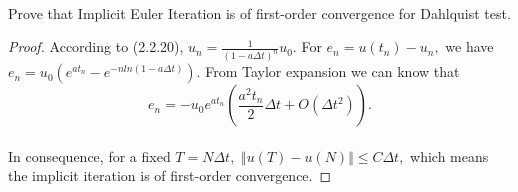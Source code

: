 \documentclass{article}
\newenvironment{problem}[2][Problem]{\begin{trivlist}
\item[\hskip \labelsep {\bfseries #1}\hskip \labelsep {\bfseries #2.}]}{\end{trivlist}}
\begin{document}
\begin{problem}{2}
\text{ }\\
Prove that Implicit Euler Iteration is of first-order convergence for Dahlquist test.
\end{problem}
\begin{proof}
\quad According to (2.2.20), $u_{n} = \frac{1}{(1-a\Delta t)^{n}}u_{0}.$ For $e_{n} = u(t_{n}) - u_{n},$ we have $e_{n} = u_{0}(e^{at_{n}} - e^{-nln(1-a\Delta t)}).$ From Taylor expansion we can know that $$e_{n} = -u_{0}e^{at_{n}}(\frac{a^{2}t_{n}}{2}\Delta t + O(\Delta t^{2})).$$\\
\quad In consequence, for a fixed $T = N\Delta t,$ $\Vert u(T) - u(N)\Vert\leqslant C\Delta t,$ which means the implicit iteration is of first-order convergence.
\end{proof}
\end{document}
